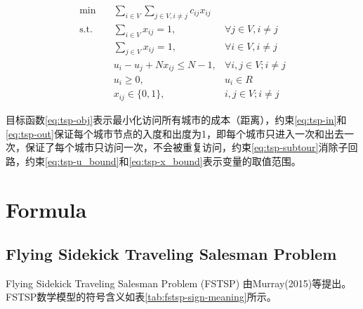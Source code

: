 \begin{align}
    \min \quad & \sum_{i \in V}\sum_{j \in V, i \neq j} c_{ij}x_{ij} & \label{eq:tsp-obj}\\
    \text{s.t.} \quad & \sum_{i \in V} x_{ij} = 1, & \forall j \in V, i \neq j\label{eq:tsp-in}\\
    \quad & \sum_{j \in V} x_{ij} = 1, & \forall i \in V, i \neq j \label{eq:tsp-out}\\
    \quad & u_i - u_j + Nx_{ij} \leq N - 1, & \forall i, j \in V; i \neq j \label{eq:tsp-subtour}\\
    \quad & u_i \geq 0, & u_i \in R \label{eq:tsp-u_bound}\\
    \quad & x_{ij} \in \{0, 1\}, & i, j \in V; i \neq j\label{eq:tsp-x_bound}
\end{align}

目标函数\ref{eq:tsp-obj}表示最小化访问所有城市的成本（距离），约束\ref{eq:tsp-in}和\ref{eq:tsp-out}保证每个城市节点的入度和出度为1，即每个城市只进入一次和出去一次，保证了每个城市只访问一次，不会被重复访问，约束\ref{eq:tsp-subtour}消除子回路，约束\ref{eq:tsp-u_bound}和\ref{eq:tsp-x_bound}表示变量的取值范围。

\chapter{Formula}

\section{Flying Sidekick Traveling Salesman Problem}
Flying Sidekick Traveling Salesman Problem (FSTSP) 由Murray(2015)等\cite{murrayFlyingSidekickTraveling2015}提出。FSTSP数学模型的符号含义如表\ref{tab:fstsp-sign-meaning}所示。

